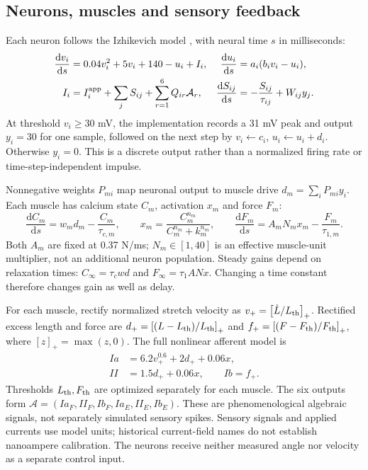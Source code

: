 \documentclass{styles/svproc}
\newcommand{\pos}[1]{\left[#1\right]_+}
\newcommand{\dd}{\mathrm{d}}
\begin{document}
\subsection{Neurons, muscles and sensory feedback}
Each neuron follows the Izhikevich model \cite{izhikevich2003}, with neural time $s$ in milliseconds:
\begin{align}
 \frac{\dd v_i}{\dd s}&=0.04v_i^2+5v_i+140-u_i+I_i,&
 \frac{\dd u_i}{\dd s}&=a_i(b_iv_i-u_i),\label{eq:neurons}\\
 I_i&=I_i^{\rm app}+\sum_jS_{ij}+\sum_{r=1}^{6}Q_{ir}\mathcal A_r,&
 \frac{\dd S_{ij}}{\dd s}&=-\frac{S_{ij}}{\tau_{ij}}+W_{ij}y_j.
\end{align}
At threshold $v_i\ge30$ mV, the implementation records a 31 mV peak and output $y_i=30$ for one sample, followed on the next step by $v_i\leftarrow c_i$, $u_i\leftarrow u_i+d_i$. Otherwise $y_i=0$. This is a discrete output rather than a normalized firing rate or time-step-independent impulse.

Nonnegative weights $P_{mi}$ map neuronal output to muscle drive $d_m=\sum_iP_{mi}y_i$. Each muscle has calcium state $C_m$, activation $x_m$ and force $F_m$:
\begin{equation}
 \frac{\dd C_m}{\dd s}=w_md_m-\frac{C_m}{\tau_{c,m}},\qquad
 x_m=\frac{C_m^{n_m}}{C_m^{n_m}+k_m^{n_m}},\qquad
 \frac{\dd F_m}{\dd s}=A_mN_mx_m-\frac{F_m}{\tau_{1,m}}.
 \label{eq:muscle}
\end{equation}
Both $A_m$ are fixed at 0.37 N/ms; $N_m\in[1,40]$ is an effective muscle-unit multiplier, not an additional neuron population. Steady gains depend on relaxation times: $C_\infty=\tau_cwd$ and $F_\infty=\tau_1ANx$. Changing a time constant therefore changes gain as well as delay.

For each muscle, rectify normalized stretch velocity as $v_+=\pos{\dot L/L_{\rm th}}$. Rectified excess length and force are $d_+=\pos{(L-L_{\rm th})/L_{\rm th}}$ and $f_+=\pos{(F-F_{\rm th})/F_{\rm th}}$, where $[z]_+=\max(z,0)$. The full nonlinear afferent model is
\begin{align}
 Ia&=6.2v_+^{0.6}+2d_++0.06x,\nonumber\\
 II&=1.5d_++0.06x,\qquad Ib=f_+.
 \label{eq:afferents}
\end{align}
Thresholds $L_{\rm th},F_{\rm th}$ are optimized separately for each muscle. The six outputs form $\mathcal A=(Ia_F,II_F,Ib_F,Ia_E,II_E,Ib_E)$. These are phenomenological algebraic signals, not separately simulated sensory spikes. Sensory signals and applied currents use model units; historical current-field names do not establish nanoampere calibration. The neurons receive neither measured angle nor velocity as a separate control input.
\end{document}
